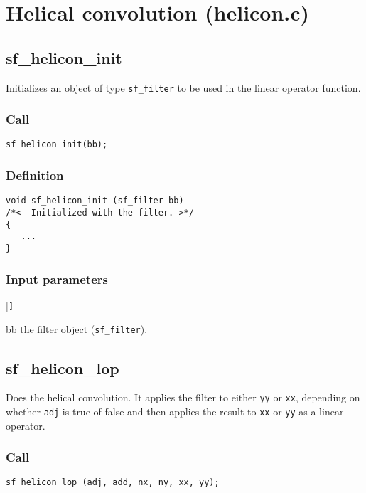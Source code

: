 \section{Helical convolution (helicon.c)}




\subsection{{sf\_helicon\_init}}
Initializes an object of type \texttt{sf\_filter} to be used in the linear operator function.


\subsubsection*{Call}
\begin{verbatim}sf_helicon_init(bb);\end{verbatim}

\subsubsection*{Definition}
\begin{verbatim}
void sf_helicon_init (sf_filter bb) 
/*<  Initialized with the filter. >*/
{
   ...
}

\end{verbatim}
\subsubsection*{Input parameters}
\begin{desclist}{\tt }{\quad}[\tt ]
   \setlength\itemsep{0pt}
   \item[bb] the filter object (\texttt{sf\_filter}).  
\end{desclist}




\subsection{{sf\_helicon\_lop}}
Does the helical convolution. It applies the filter to either \texttt{yy} or \texttt{xx}, depending on whether \texttt{adj} is true of false and then applies the result to \texttt{xx} or \texttt{yy} as a linear operator.

\subsubsection*{Call}
\begin{verbatim}sf_helicon_lop (adj, add, nx, ny, xx, yy);\end{verbatim}


